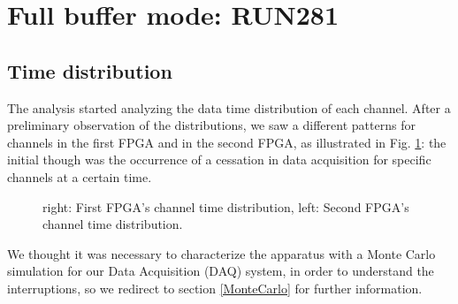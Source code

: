 \section{Full buffer mode: RUN281}
\subsection{Time distribution}
The analysis started analyzing the data time distribution of each channel.
After a preliminary observation of the distributions, we saw a different patterns for channels in the first FPGA and in the second FPGA,
as illustrated in Fig. \ref{fig:1}: the initial though  was the occurrence of a cessation in data acquisition for specific channels at a certain time.

\begin{figure}[H]
  \hspace{-0.5in}
  \caption{
    \label{fig:1}
    right: First FPGA's channel time distribution, left: Second FPGA's channel time distribution.
  }
\end{figure}
We thought it was necessary to characterize the apparatus with a Monte Carlo simulation for our Data Acquisition (DAQ) system, in order to understand the interruptions,
so we redirect to section \ref{MonteCarlo} for further information.
